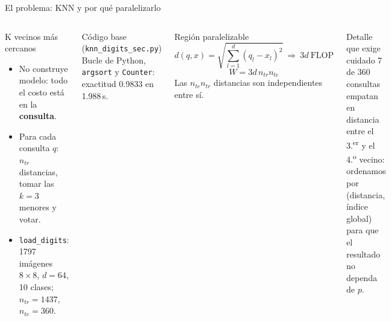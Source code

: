 \documentclass[aspectratio=169,10pt]{beamer}
\newcommand{\ntr}{n_{tr}}
\newcommand{\nte}{n_{te}}
\renewenvironment{block}[1]{\begin{caja}[cajagris]{#1}}{\end{caja}}
\renewenvironment{alertblock}[1]{\begin{caja}[cajaroja]{#1}}{\end{caja}}
\begin{document}
\begin{frame}{El problema: KNN y por qué paralelizarlo}
\begin{columns}[T]
\begin{block}{K vecinos más cercanos}
\begin{itemize}\setlength{\itemsep}{2pt}
\item No construye modelo: todo el costo está en la \textbf{consulta}.
\item Para cada consulta $q$: $\ntr$ distancias, tomar las $k=3$ menores y votar.
\item \texttt{load\_digits}: 1797 imágenes $8\times8$, $d=64$, 10 clases; $\ntr=1437$, $\nte=360$.
\end{itemize}
\end{block}
\begin{block}{Código base (\texttt{knn\_digits\_sec.py})}
Bucle de Python, \texttt{argsort} y \texttt{Counter}: exactitud 0.9833 en 1.988\,s.
\end{block}
\begin{block}{Región paralelizable}
\[
d(q,x)=\sqrt{\textstyle\sum_{l=1}^{d}(q_l-x_l)^2}\ \Rightarrow\ 3d\ \text{FLOP}
\]
\[
W=3d\,\ntr\nte
\]
Las $\nte\ntr$ distancias son independientes entre sí.
\end{block}
\begin{alertblock}{Detalle que exige cuidado}
7 de 360 consultas empatan en distancia entre el 3.\textsuperscript{er} y el 4.\textsuperscript{o} vecino: ordenamos por (distancia, índice global) para que el resultado no dependa de $p$.
\end{alertblock}
\end{columns}
\end{frame}
\end{document}
